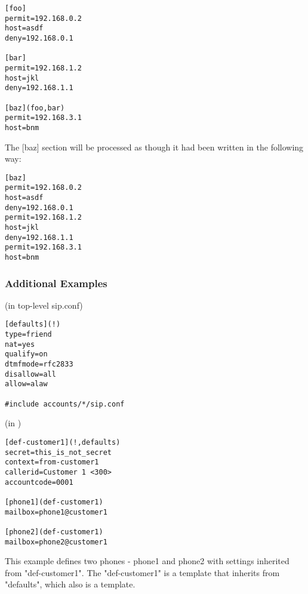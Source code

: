 \begin{astlisting}
\begin{verbatim}
[foo]
permit=192.168.0.2
host=asdf
deny=192.168.0.1

[bar]
permit=192.168.1.2
host=jkl
deny=192.168.1.1

[baz](foo,bar)
permit=192.168.3.1
host=bnm
\end{verbatim}
\end{astlisting}

The [baz] section will be processed as though it had been written in the
following way:

\begin{astlisting}
\begin{verbatim}
[baz]
permit=192.168.0.2
host=asdf
deny=192.168.0.1
permit=192.168.1.2
host=jkl
deny=192.168.1.1
permit=192.168.3.1
host=bnm
\end{verbatim}
\end{astlisting}

\subsubsection{Additional Examples}

(in top-level sip.conf)

\begin{astlisting}
\begin{verbatim}
[defaults](!)
type=friend
nat=yes
qualify=on
dtmfmode=rfc2833
disallow=all
allow=alaw

#include accounts/*/sip.conf
\end{verbatim}
\end{astlisting}

(in )

\begin{astlisting}
\begin{verbatim}
[def-customer1](!,defaults)
secret=this_is_not_secret
context=from-customer1
callerid=Customer 1 <300>
accountcode=0001

[phone1](def-customer1)
mailbox=phone1@customer1

[phone2](def-customer1)
mailbox=phone2@customer1
\end{verbatim}
\end{astlisting}

This example defines two phones - phone1 and phone2 with settings
inherited from "def-customer1".  The "def-customer1" is a template that
inherits from "defaults", which also is a template.
